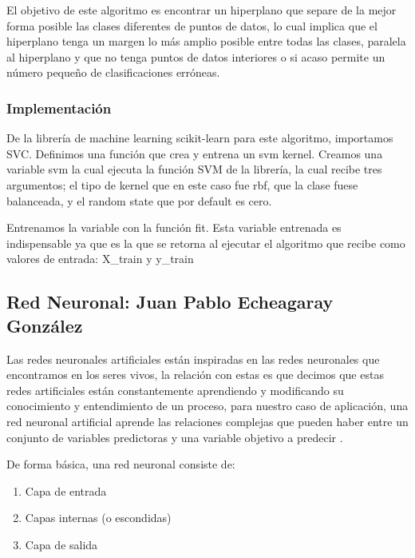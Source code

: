 \documentclass[journal]{IEEEtran}                                                          %
\begin{document}
            El objetivo de este algoritmo es encontrar un hiperplano que separe de la mejor forma posible las clases diferentes de puntos de datos, lo cual implica que el hiperplano tenga un margen lo más amplio posible entre todas las clases, paralela al hiperplano y que no tenga puntos de datos interiores o si acaso permite un número pequeño de clasificaciones erróneas.

            \subsubsection{Implementación}

                De la librería de machine learning scikit-learn para este algoritmo, importamos SVC. Definimos una función que crea y entrena un svm kernel. Creamos una variable svm la cual ejecuta la función SVM de la librería, la cual recibe tres argumentos; el tipo de kernel que en este caso fue rbf, que la clase fuese balanceada, y el random state que por default es cero.

                Entrenamos la variable con la función fit. Esta variable entrenada es indispensable ya que es la que se retorna al ejecutar el algoritmo que recibe como valores de entrada: X\_train y y\_train

        \subsection{Red Neuronal: Juan Pablo Echeagaray González} \label{neural-network}
           
            Las redes neuronales artificiales están inspiradas en las redes neuronales que encontramos en los seres vivos, la relación con estas es que decimos que estas redes artificiales están constantemente aprendiendo y modificando su conocimiento y entendimiento de un proceso, para nuestro caso de aplicación, una red neuronal artificial aprende las relaciones complejas que pueden haber entre un conjunto de variables predictoras y una variable objetivo a predecir \cite{geron-2019}.

            De forma básica, una red neuronal consiste de:
            \begin{enumerate}
                \item Capa de entrada
                \item Capas internas (o escondidas)
                \item Capa de salida
            \end{enumerate}
\end{document}
